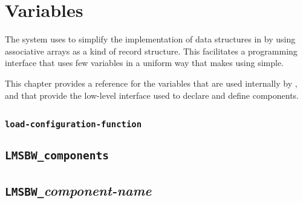 \chapter{Variables}

The \lmsbw system uses \gmsl to simplify the implementation of data
structures in \make by using associative arrays as a kind of record
structure.  This facilitates a programming interface that uses few
variables in a uniform way that makes using \lmsbw simple.

This chapter provides a reference for the variables that are used
internally by \lmsbw, and that provide the low-level interface used to
declare and define components.

\section{\lmsbwconfiguration}
\subsection{\texttt{load-configuration-function}}

\section{\texttt{LMSBW\_components}}

\section{\texttt{LMSBW\_}\emph{component-name}}
